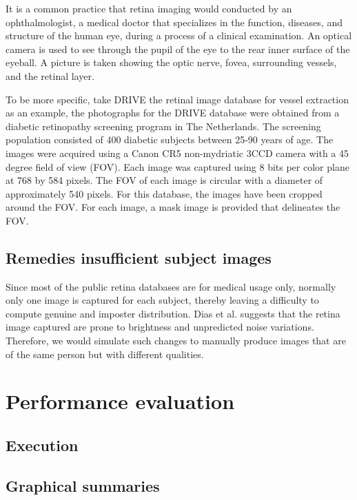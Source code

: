 \documentclass[a4paper,11pt]{article}
\theoremstyle{plain} %
\begin{document}
It is a common practice that retina imaging would conducted by an ophthalmologist, a medical doctor that specializes in the function, diseases, and structure of the human eye, during a process of a clinical examination. An optical camera is used to see through the pupil of the eye to the rear inner surface of the eyeball. A picture is taken showing the optic nerve, fovea, surrounding vessels, and the retinal layer.

To be more specific, take DRIVE the retinal image database for vessel extraction as an example, the photographs for the DRIVE database were obtained from a diabetic retinopathy screening program in The Netherlands. The screening population consisted of 400 diabetic subjects between 25-90 years of age. The images were acquired using a Canon CR5 non-mydriatic 3CCD camera with a 45 degree field of view (FOV). Each image was captured using 8 bits per color plane at 768 by 584 pixels. The FOV of each image is circular with a diameter of approximately 540 pixels. For this database, the images have been cropped around the FOV. For each image, a mask image is provided that delineates the FOV.

\subsection{Remedies insufficient subject images}
Since most of the public retina databases are for medical usage only, normally only one image is captured for each subject, thereby leaving a difficulty to compute genuine and imposter distribution. Dias et al. \cite{dias2014retinal} suggests that the retina image captured are prone to brightness and unpredicted noise variations. Therefore, we would simulate such changes to manually produce images that are of the same person but with different qualities. 



\section{Performance evaluation}

\subsection{Execution}

\subsection{Graphical summaries}
\end{document}
